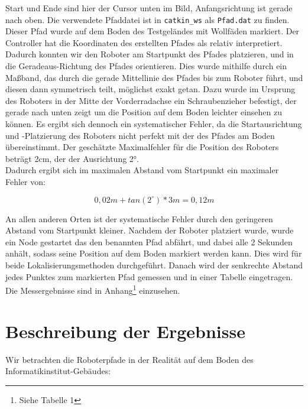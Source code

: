 \documentclass[11pt,a4paper]{article}
\begin{document}
Start und Ende sind hier der Cursor unten im Bild, Anfangsrichtung ist gerade nach oben. Die verwendete Pfaddatei ist in \verb+catkin_ws+ als 
\verb+Pfad.dat+ zu finden.
Dieser Pfad wurde auf dem Boden des Testgeländes mit Wollfäden markiert. Der Controller hat die Koordinaten des erstellten Pfades 
als relativ interpretiert. Dadurch konnten wir den Roboter am Startpunkt des Pfades platzieren, und in die Geradeaus-Richtung des Pfades orientieren. 
Dies wurde mithilfe durch ein Maßband, das durch die gerade Mittellinie des Pfades bis zum Roboter führt, und diesen dann symmetrisch teilt, möglichst exakt getan. 
Dazu wurde im Ursprung des Roboters in der Mitte der Vorderradachse ein Schraubenzieher befestigt, der gerade nach unten zeigt um die Position auf dem 
Boden leichter einsehen zu können. Es ergibt sich dennoch ein systematischer Fehler, da die Startausrichtung und -Platzierung des Roboters nicht perfekt 
mit der des Pfades am Boden übereinstimmt. Der geschätzte Maximalfehler für die Position des Roboters beträgt 2cm, der der Ausrichtung 2°. 
\\Dadurch ergibt sich im maximalen Abstand vom Startpunkt ein maximaler Fehler von: \vspace*{-2mm}

\begin{equation*}
  0,02m + tan(2^\circ) * 3m = 0,12m
\end{equation*}

An allen anderen Orten ist der systematische Fehler durch den geringeren Abstand vom Startpunkt kleiner.
Nachdem der Roboter platziert wurde, wurde ein Node gestartet das den benannten Pfad abfährt, und dabei alle 2 Sekunden anhält, sodass seine Position 
auf dem Boden markiert werden kann. Dies wird für beide Lokalisierungsmethoden durchgeführt. Danach wird der senkrechte Abstand jedes Punktes 
zum markierten Pfad gemessen und in einer Tabelle eingetragen. Die Messergebnisse sind in Anhang\footnote{Siehe Tabelle 1} einzusehen.

\section{Beschreibung der Ergebnisse}

Wir betrachten die Roboterpfade in der Realität auf dem Boden des Informatikinstitut-Gebäudes:
\end{document}
